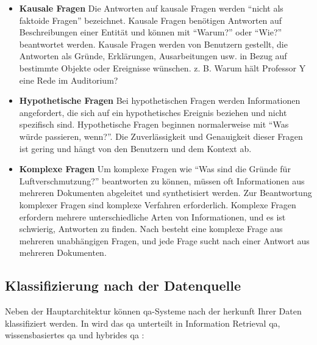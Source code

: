 \documentclass[
        ngerman,
        paper=a4,
        numbers=noendperiod,
]{scrreprt}
\begin{document}
\begin{itemize}
    \item \textbf{Kausale Fragen} 
    Die Antworten auf kausale Fragen werden \enquote{nicht als faktoide Fragen} bezeichnet. Kausale Fragen benötigen Antworten auf Beschreibungen einer Entität und können mit \enquote{Warum?} oder \enquote{Wie?} beantwortet werden. Kausale Fragen werden von Benutzern gestellt, die Antworten als Gründe, Erklärungen, Ausarbeitungen usw. in Bezug auf bestimmte Objekte oder Ereignisse wünschen.
    z. B. Warum hält Professor Y eine Rede im Auditorium?
    \item \textbf{Hypothetische Fragen}
    Bei hypothetischen Fragen werden Informationen angefordert, die sich auf ein hypothetisches Ereignis beziehen und nicht spezifisch sind. Hypothetische Fragen beginnen normalerweise mit \enquote{Was würde passieren, wenn?}. Die Zuverlässigkeit und Genauigkeit dieser Fragen ist gering und hängt von den Benutzern und dem Kontext ab.
    \item \textbf{Komplexe Fragen}
    Um komplexe Fragen wie \enquote{Was sind die Gründe für Luftverschmutzung?} beantworten zu können, müssen oft Informationen aus mehreren Dokumenten abgeleitet und synthetisiert werden. Zur Beantwortung komplexer Fragen sind komplexe Verfahren erforderlich. Komplexe Fragen erfordern mehrere unterschiedliche Arten von Informationen, und es ist schwierig, Antworten zu finden. Nach \citep{basuki2016statistical} besteht eine komplexe Frage aus mehreren unabhängigen Fragen, und jede Frage sucht nach einer Antwort aus mehreren Dokumenten.
    
\end{itemize}


\subsection{Klassifizierung nach der Datenquelle}
Neben der Hauptarchitektur können \ac{qa}-Systeme nach der herkunft Ihrer Daten klassifiziert werden. In \citep{Jurafsky2014SpeechProcessing} wird das \ac{qa} unterteilt in Information Retrieval \ac{qa},  wissensbasiertes \ac{qa} und hybrides \ac{qa} \citep{Ojokoh2019ASystems}:


\end{document}
